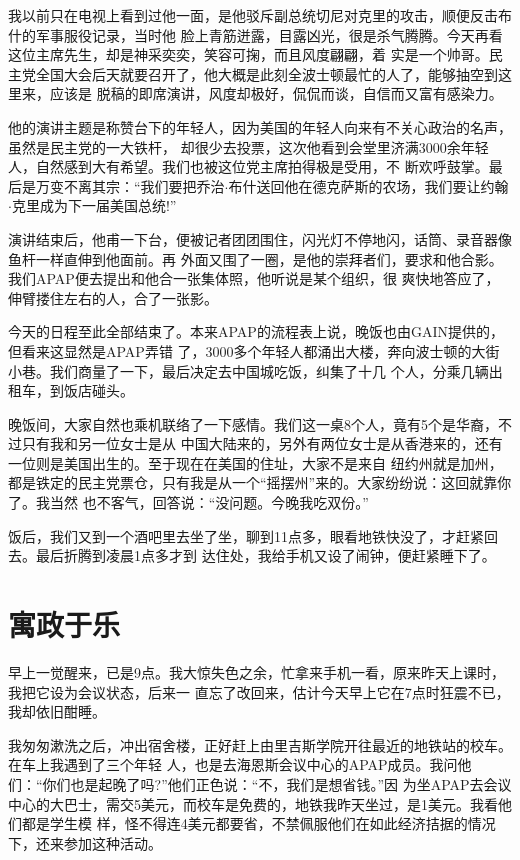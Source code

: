 ﻿\documentclass[11pt]{article}
\begin{document}
我以前只在电视上看到过他一面，是他驳斥副总统切尼对克里的攻击，顺便反击布什的军事服役记录，当时他
脸上青筋迸露，目露凶光，很是杀气腾腾。今天再看这位主席先生，却是神采奕奕，笑容可掬，而且风度翩翩，着
实是一个帅哥。民主党全国大会后天就要召开了，他大概是此刻全波士顿最忙的人了，能够抽空到这里来，应该是
脱稿的即席演讲，风度却极好，侃侃而谈，自信而又富有感染力。

他的演讲主题是称赞台下的年轻人，因为美国的年轻人向来有不关心政治的名声，虽然是民主党的一大铁杆，
却很少去投票，这次他看到会堂里济满3000余年轻人，自然感到大有希望。我们也被这位党主席拍得极是受用，不
断欢呼鼓掌。最后是万变不离其宗：``我们要把乔治$\cdot$布什送回他在德克萨斯的农场，我们要让约翰
$\cdot$克里成为下一届美国总统!''

演讲结束后，他甫一下台，便被记者团团围住，闪光灯不停地闪，话筒、录音器像鱼杆一样直伸到他面前。再
外面又围了一圈，是他的崇拜者们，要求和他合影。我们APAP便去提出和他合一张集体照，他听说是某个组织，很
爽快地答应了，伸臂搂住左右的人，合了一张影。

今天的日程至此全部结束了。本来APAP的流程表上说，晚饭也由GAIN提供的，但看来这显然是APAP弄错
了，3000多个年轻人都涌出大楼，奔向波士顿的大街小巷。我们商量了一下，最后决定去中国城吃饭，纠集了十几
个人，分乘几辆出租车，到饭店碰头。

晚饭间，大家自然也乘机联络了一下感情。我们这一桌8个人，竟有5个是华裔，不过只有我和另一位女士是从
中国大陆来的，另外有两位女士是从香港来的，还有一位则是美国出生的。至于现在在美国的住址，大家不是来自
纽约州就是加州，都是铁定的民主党票仓，只有我是从一个``摇摆州''来的。大家纷纷说：这回就靠你了。我当然
也不客气，回答说：``没问题。今晚我吃双份。''

饭后，我们又到一个酒吧里去坐了坐，聊到11点多，眼看地铁快没了，才赶紧回去。最后折腾到凌晨1点多才到
达住处，我给手机又设了闹钟，便赶紧睡下了。

\section{寓政于乐}

早上一觉醒来，已是9点。我大惊失色之余，忙拿来手机一看，原来昨天上课时，我把它设为会议状态，后来一
直忘了改回来，估计今天早上它在7点时狂震不已，我却依旧酣睡。

我匆匆漱洗之后，冲出宿舍楼，正好赶上由里吉斯学院开往最近的地铁站的校车。在车上我遇到了三个年轻
人，也是去海恩斯会议中心的APAP成员。我问他们：``你们也是起晚了吗?''他们正色说：``不，我们是想省钱。''因
为坐APAP去会议中心的大巴士，需交5美元，而校车是免费的，地铁我昨天坐过，是1美元。我看他们都是学生模
样，怪不得连4美元都要省，不禁佩服他们在如此经济拮据的情况下，还来参加这种活动。
\end{document}
